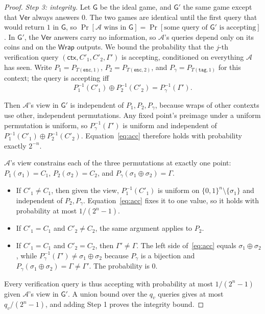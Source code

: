 \documentclass[11pt]{article}
\theoremstyle{remark}
\begin{document}
\begin{proof}
\emph{Step 3: integrity.} Let $\mathsf{G}$ be the ideal game, and $\mathsf{G}'$ the same game except that $\mathsf{Ver}$ always answers $0$. The two games are identical until the first query that would return $1$ in $\mathsf{G}$, so $\Pr[\mathcal{A} \text{ wins in } \mathsf{G}] = \Pr[\text{some query of } \mathsf{G}' \text{ is accepting}]$. In $\mathsf{G}'$, the $\mathsf{Ver}$ answers carry no information, so $\mathcal{A}$'s queries depend only on its coins and on the $\mathsf{Wrap}$ outputs. We bound the probability that the $j$-th verification query $(\mathsf{ctx}, C'_1, C'_2, \Gamma')$ is accepting, conditioned on everything $\mathcal{A}$ has seen. Write $P_1 = P_{T(\mathtt{enc},1)}$, $P_2 = P_{T(\mathtt{enc},2)}$, and $P_\gamma = P_{T(\mathtt{tag},1)}$ for this context; the query is accepting iff
\begin{equation}
P_1^{-1}(C'_1) \oplus P_2^{-1}(C'_2) = P_\gamma^{-1}(\Gamma').
\label{eq:acc}
\end{equation}
\begin{description}[leftmargin=1em,style=nextline]
\item[Case (a): $\mathsf{ctx}$ was never wrapped.] Then $\mathcal{A}$'s view in $\mathsf{G}'$ is independent of $P_1, P_2, P_\gamma$, because wraps of other contexts use other, independent permutations. Any fixed point's preimage under a uniform permutation is uniform, so $P_\gamma^{-1}(\Gamma')$ is uniform and independent of $P_1^{-1}(C'_1) \oplus P_2^{-1}(C'_2)$. Equation~\eqref{eq:acc} therefore holds with probability exactly $2^{-n}$.
\item[Case (b): $\mathsf{ctx}$ was wrapped as $(C_1, C_2, \Gamma)$ for $(\sigma_1, \sigma_2)$, and $(C'_1, C'_2, \Gamma') \ne (C_1, C_2, \Gamma)$.] $\mathcal{A}$'s view constrains each of the three permutations at exactly one point: $P_1(\sigma_1) = C_1$, $P_2(\sigma_2) = C_2$, and $P_\gamma(\sigma_1\oplus\sigma_2) = \Gamma$.
  \begin{itemize}
  \item If $C'_1 \ne C_1$, then given the view, $P_1^{-1}(C'_1)$ is uniform on $\{0,1\}^n \setminus \{\sigma_1\}$ and independent of $P_2, P_\gamma$. Equation~\eqref{eq:acc} fixes it to one value, so it holds with probability at most $1/(2^n - 1)$.
  \item If $C'_1 = C_1$ and $C'_2 \neq C_2$, the same argument applies to $P_2$.
  \item If $C'_1 = C_1$ and $C'_2 = C_2$, then $\Gamma' \ne \Gamma$. The left side of~\eqref{eq:acc} equals $\sigma_1 \oplus \sigma_2$, while $P_\gamma^{-1}(\Gamma') \ne \sigma_1\oplus\sigma_2$ because $P_\gamma$ is a bijection and $P_\gamma(\sigma_1\oplus\sigma_2) = \Gamma \ne \Gamma'$. The probability is $0$.
  \end{itemize}
\end{description}
Every verification query is thus accepting with probability at most $1/(2^n - 1)$ given $\mathcal{A}$'s view in $\mathsf{G}'$. A union bound over the $q_v$ queries gives at most $q_v/(2^n - 1)$, and adding Step 1 proves the integrity bound.
\end{proof}
\end{document}

